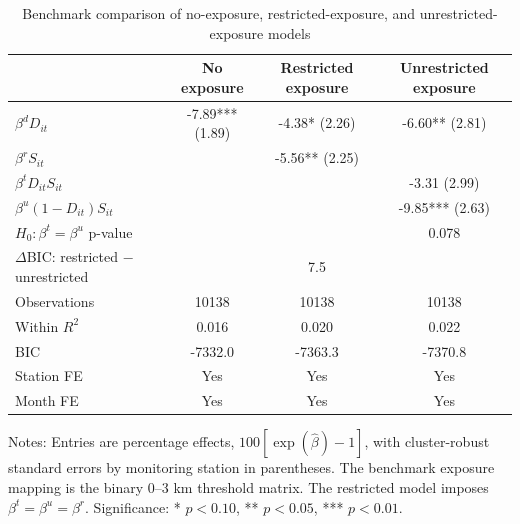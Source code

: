 \begin{table}[!htbp]\centering
\caption{Benchmark comparison of no-exposure, restricted-exposure, and unrestricted-exposure models}
\label{tab:ulez_no_restricted_unrestricted}
\begin{threeparttable}
\small
\setlength{\tabcolsep}{3pt}
\renewcommand{\arraystretch}{1.10}
\begin{tabularx}{\textwidth}{@{}>{\RaggedRight\arraybackslash}Xccc@{}}
\toprule
 & No exposure & Restricted exposure & Unrestricted exposure \\
\midrule
$\beta^d D_{it}$ & -7.89*** (1.89) & -4.38* (2.26) & -6.60** (2.81) \\
$\beta^r S_{it}$ &  & -5.56** (2.25) &  \\
$\beta^t D_{it}S_{it}$ &  &  & -3.31 (2.99) \\
$\beta^u(1-D_{it})S_{it}$ &  &  & -9.85*** (2.63) \\
\midrule
$H_0:\beta^t=\beta^u$ p-value &  &  & 0.078 \\
$\Delta$BIC: restricted $-$ unrestricted &  & 7.5 &  \\
\midrule
Observations & 10138 & 10138 & 10138 \\
Within $R^2$ & 0.016 & 0.020 & 0.022 \\
BIC & -7332.0 & -7363.3 & -7370.8 \\
Station FE & Yes & Yes & Yes \\
Month FE & Yes & Yes & Yes \\
\bottomrule
\end{tabularx}
\begin{tablenotes}[flushleft]
\footnotesize
\item Notes: Entries are percentage effects, $100[\exp(\hat\beta)-1]$, with cluster-robust standard errors by monitoring station in parentheses. The benchmark exposure mapping is the binary 0--3 km threshold matrix. The restricted model imposes $\beta^t=\beta^u=\beta^r$. Significance: * $p<0.10$, ** $p<0.05$, *** $p<0.01$.
\end{tablenotes}
\end{threeparttable}
\end{table}
